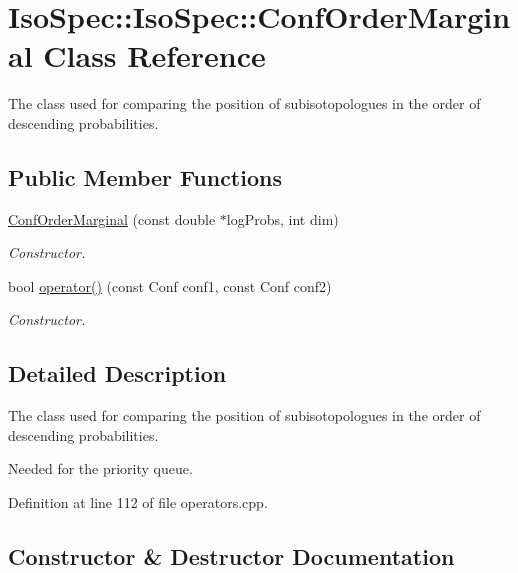 \hypertarget{class_iso_spec_1_1_iso_spec_1_1_conf_order_marginal}{}\section{Iso\+Spec\+:\+:Iso\+Spec\+:\+:Conf\+Order\+Marginal Class Reference}
\label{class_iso_spec_1_1_iso_spec_1_1_conf_order_marginal}


The class used for comparing the position of subisotopologues in the order of descending probabilities.  


\subsection*{Public Member Functions}
\begin{DoxyCompactItemize}
\item 
\mbox{\hyperlink{class_iso_spec_1_1_iso_spec_1_1_conf_order_marginal_a91c7b8d57bcd751f08f064802f3c8b87}{Conf\+Order\+Marginal}} (const double $\ast$log\+Probs, int dim)
\begin{DoxyCompactList}\small\item\em Constructor. \end{DoxyCompactList}\item 
bool \mbox{\hyperlink{class_iso_spec_1_1_iso_spec_1_1_conf_order_marginal_a617a19a4c112750abde2153276c90612}{operator()}} (const Conf conf1, const Conf conf2)
\begin{DoxyCompactList}\small\item\em Constructor. \end{DoxyCompactList}\end{DoxyCompactItemize}


\subsection{Detailed Description}
The class used for comparing the position of subisotopologues in the order of descending probabilities. 

Needed for the priority queue. 

Definition at line 112 of file operators.\+cpp.



\subsection{Constructor \& Destructor Documentation}
\mbox{\label{class_iso_spec_1_1_iso_spec_1_1_conf_order_marginal_a91c7b8d57bcd751f08f064802f3c8b87}} 
